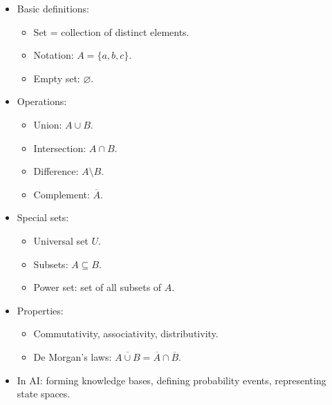 \documentclass[
  letterpaper,
  DIV=11,
  numbers=noendperiod]{scrreprt}
\providecommand{\tightlist}{%
  \setlength{\itemsep}{0pt}\setlength{\parskip}{0pt}}
\begin{document}
\begin{itemize}
\item
  Basic definitions:

  \begin{itemize}
  \tightlist
  \item
    Set = collection of distinct elements.
  \item
    Notation: \(A = \{a, b, c\}\).
  \item
    Empty set: \(\varnothing\).
  \end{itemize}
\item
  Operations:

  \begin{itemize}
  \tightlist
  \item
    Union: \(A \cup B\).
  \item
    Intersection: \(A \cap B\).
  \item
    Difference: \(A \setminus B\).
  \item
    Complement: \(\overline{A}\).
  \end{itemize}
\item
  Special sets:

  \begin{itemize}
  \tightlist
  \item
    Universal set \(U\).
  \item
    Subsets: \(A \subseteq B\).
  \item
    Power set: set of all subsets of \(A\).
  \end{itemize}
\item
  Properties:

  \begin{itemize}
  \tightlist
  \item
    Commutativity, associativity, distributivity.
  \item
    De Morgan's laws:
    \(\overline{A \cup B} = \overline{A} \cap \overline{B}\).
  \end{itemize}
\item
  In AI: forming knowledge bases, defining probability events,
  representing state spaces.
\end{itemize}
\end{document}
